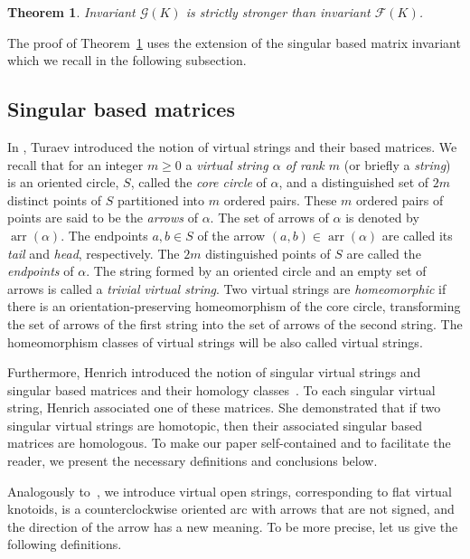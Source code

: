\documentclass[11pt]{amsart}
\theoremstyle{noparens}
\newtheorem{theorem}{Theorem}[section]
\numberwithin{equation}{section}
\numberwithin{equation}{section}
\begin{document}
\begin{theorem}\label{th4.2}
Invariant $\mathcal{G}(K)$ is strictly stronger than invariant $\mathcal{F} (K)$. 
\end{theorem} 

The proof of Theorem~\ref{th4.2} uses the extension of the singular based matrix invariant which we recall in the following subsection. 

\subsection{Singular based matrices}

In \cite{Tur2}, Turaev introduced the notion of virtual strings and their based matrices. 
We recall that for an integer $m \geq 0$ a \textit{virtual string $\alpha$ of rank $m$} (or briefly a \textit{string}) is an oriented circle, $S$, called the \textit{core circle} of $\alpha$, and a distinguished set of $2m$ distinct points of $S$ partitioned into $m$ ordered pairs. These $m$ ordered pairs of points are said to be the \textit{arrows} of $\alpha$.  The set of arrows of $\alpha$ is denoted by $\operatorname{arr} (\alpha)$. The endpoints $a, b \in S$ of the arrow $(a,b) \in \operatorname{arr}(\alpha)$ are called its \textit{tail} and \textit{head}, respectively. The $2m$ distinguished points of $S$ are called the \textit{endpoints} of $\alpha$. The string formed by an oriented circle and an empty set of arrows is called a \textit{trivial virtual string}. Two virtual strings are \textit{homeomorphic} if there is an orientation-preserving homeomorphism of the core circle, transforming the set of arrows of the first string into the set of arrows of the second string. The homeomorphism classes of virtual strings will be also called virtual strings. 

Furthermore, Henrich introduced the notion of singular virtual strings and singular based matrices and their homology classes~\cite{Hen}. To each singular virtual string, Henrich associated one of these matrices. She demonstrated that if two singular virtual strings are homotopic, then their associated singular based matrices are homologous. To make our paper self-contained and to facilitate the reader, we present the necessary definitions and conclusions below.

Analogously to~\cite{Tur2, Hen}, we introduce virtual open strings, corresponding to flat virtual knotoids, is a counterclockwise oriented arc with arrows that are not signed, and the direction of the arrow has a new meaning. To be more precise, let us give the following definitions.
\end{document}
